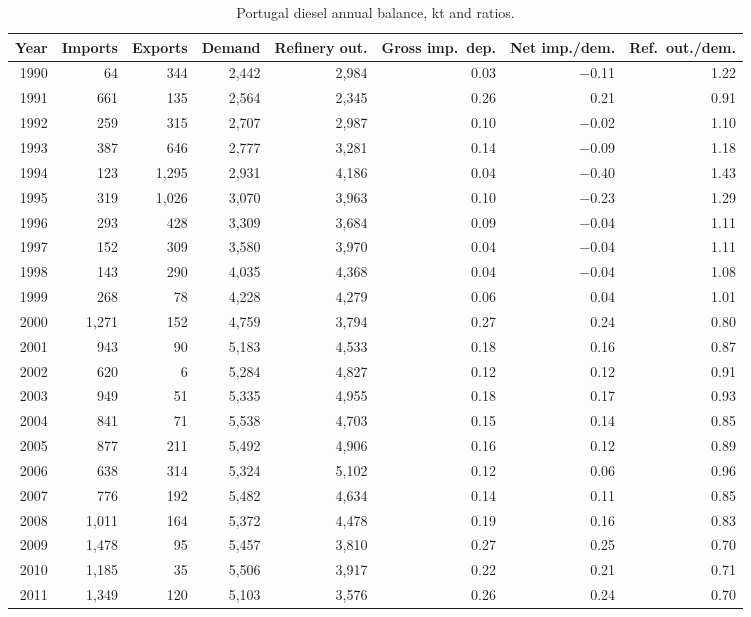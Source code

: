 \documentclass[11pt,a4paper]{article}
\begin{document}
\begin{table}[htbp]
\centering
\caption{Portugal diesel annual balance, kt and ratios.}
\label{tab:diesel}
\small
\begin{tabular}{rrrrrrrr}
\toprule
Year & Imports & Exports & Demand & Refinery out. & Gross imp.\ dep. & Net imp./dem. & Ref.\ out./dem. \\
\midrule
1990 & 64 & 344 & 2{,}442 & 2{,}984 & 0.03 & $-$0.11 & 1.22 \\
1991 & 661 & 135 & 2{,}564 & 2{,}345 & 0.26 & 0.21 & 0.91 \\
1992 & 259 & 315 & 2{,}707 & 2{,}987 & 0.10 & $-$0.02 & 1.10 \\
1993 & 387 & 646 & 2{,}777 & 3{,}281 & 0.14 & $-$0.09 & 1.18 \\
1994 & 123 & 1{,}295 & 2{,}931 & 4{,}186 & 0.04 & $-$0.40 & 1.43 \\
1995 & 319 & 1{,}026 & 3{,}070 & 3{,}963 & 0.10 & $-$0.23 & 1.29 \\
1996 & 293 & 428 & 3{,}309 & 3{,}684 & 0.09 & $-$0.04 & 1.11 \\
1997 & 152 & 309 & 3{,}580 & 3{,}970 & 0.04 & $-$0.04 & 1.11 \\
1998 & 143 & 290 & 4{,}035 & 4{,}368 & 0.04 & $-$0.04 & 1.08 \\
1999 & 268 & 78 & 4{,}228 & 4{,}279 & 0.06 & 0.04 & 1.01 \\
2000 & 1{,}271 & 152 & 4{,}759 & 3{,}794 & 0.27 & 0.24 & 0.80 \\
2001 & 943 & 90 & 5{,}183 & 4{,}533 & 0.18 & 0.16 & 0.87 \\
2002 & 620 & 6 & 5{,}284 & 4{,}827 & 0.12 & 0.12 & 0.91 \\
2003 & 949 & 51 & 5{,}335 & 4{,}955 & 0.18 & 0.17 & 0.93 \\
2004 & 841 & 71 & 5{,}538 & 4{,}703 & 0.15 & 0.14 & 0.85 \\
2005 & 877 & 211 & 5{,}492 & 4{,}906 & 0.16 & 0.12 & 0.89 \\
2006 & 638 & 314 & 5{,}324 & 5{,}102 & 0.12 & 0.06 & 0.96 \\
2007 & 776 & 192 & 5{,}482 & 4{,}634 & 0.14 & 0.11 & 0.85 \\
2008 & 1{,}011 & 164 & 5{,}372 & 4{,}478 & 0.19 & 0.16 & 0.83 \\
2009 & 1{,}478 & 95 & 5{,}457 & 3{,}810 & 0.27 & 0.25 & 0.70 \\
2010 & 1{,}185 & 35 & 5{,}506 & 3{,}917 & 0.22 & 0.21 & 0.71 \\
2011 & 1{,}349 & 120 & 5{,}103 & 3{,}576 & 0.26 & 0.24 & 0.70 \\

\end{tabular}
\end{table}
\end{document}
